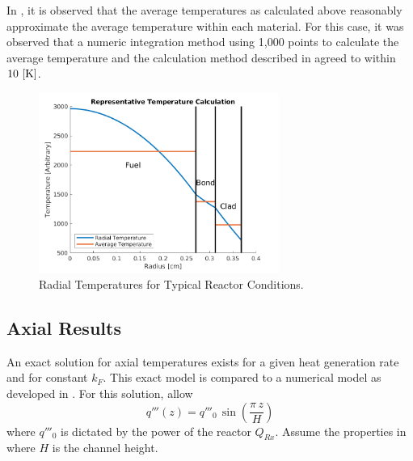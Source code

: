     In , it is observed that the average temperatures
    as calculated above reasonably approximate the average temperature within 
    each material. For this case, it was observed that a numeric integration 
    method using 1,000 points to calculate the average temperature and the
    calculation method described in  agreed to within 
    $10 \,\left[\text{{K}}\right]$.

    \begin{figure}
      \centering
      \includegraphics[width=0.7\textwidth]{radial_temp_plot}
      \caption{Radial Temperatures for Typical Reactor Conditions.}
      \label{fig:radial_temp_plot}
    \end{figure}

  \subsection{Axial Results}
    An exact solution for axial temperatures exists for a given heat generation
    rate and for constant $k_F$. This exact model is compared to a numerical
    model as developed in . For this solution,
    allow
    \begin{equation}
      q'''(z) = q'''_0 \, \sin\left( \frac{\pi \, z}{H}\right)
    \end{equation}
    where $q'''_0$ is dictated by the power of the reactor $Q_{Rx}$. Assume the
    properties in  where $H$ is the channel
    height.
    
